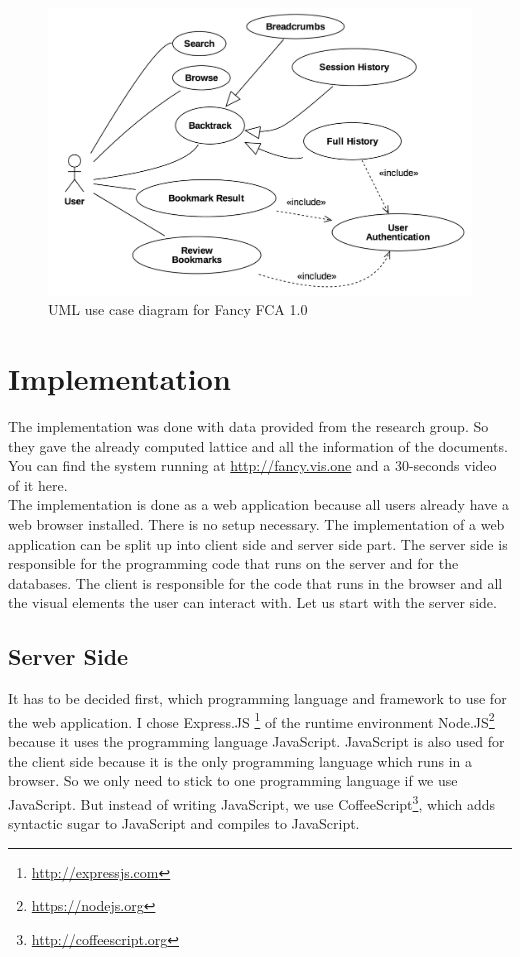 \documentclass[11pt]{report}
\begin{document}
\begin{figure}[!ht]
	\centering
	\includegraphics[width=\linewidth]{images/usecase}
\caption{UML use case diagram for Fancy FCA 1.0}
\label{figure:usecase}
\end{figure}

\section{Implementation}

The implementation was done with data provided from the research group. So they gave the already computed lattice and all the information of the documents. You can find the system running at \url{http://fancy.vis.one} and a 30-seconds video of it here. \\

The implementation is done as a web application because all users already have a web browser installed. There is no setup necessary. The implementation of a web application can be split up into client side  and server side part. The server side is responsible for the programming code that runs on the server and for the databases. The client is responsible for the code that runs in the browser and all the visual elements the user can interact with. Let us start with the server side.

\subsection{Server Side}

It has to be decided first, which programming language and framework to use for the web application. I chose Express.JS \footnote{\url{http://expressjs.com}} of the runtime environment Node.JS\footnote{\url{https://nodejs.org}} because it uses the programming language JavaScript. JavaScript is also used for the client side because it is the only programming language which runs in a browser. So we only need to stick to one programming language if we use JavaScript. But instead of writing JavaScript, we use CoffeeScript\footnote{\url{http://coffeescript.org}}, which adds \gls{syntactic sugar} to JavaScript and compiles to JavaScript.\\
\end{document}
